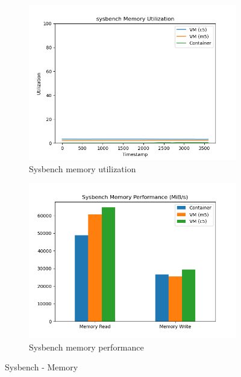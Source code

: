 \documentclass[11pt]{article}
\begin{document}
\begin{figure}[H]
\centering
\begin{subfigure}{.5\textwidth}
  \centering
  \includegraphics[width=1.1\linewidth]{sysbench_mem.png}
  \caption{Sysbench memory utilization}
  \label{fig:sysbm1}
\end{subfigure}%
\begin{subfigure}{.5\textwidth}
  \centering
  \includegraphics[width=1.1\linewidth]{sysbench_mem_bar.png}
  \caption{Sysbench memory performance}
  \label{fig:sysbm2}
\end{subfigure}
\caption{Sysbench - Memory}
\label{fig:rubis}
\end{figure}
\end{document}
